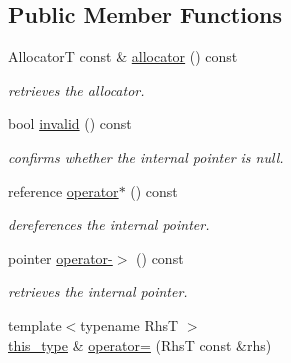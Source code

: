 \subsection*{Public Member Functions}
\begin{DoxyCompactItemize}
\item 
\hypertarget{classhryky_1_1_shared_ptr_a6238460a4d882766f62458ad727f7bb4}{Allocator\-T const \& \hyperlink{classhryky_1_1_shared_ptr_a6238460a4d882766f62458ad727f7bb4}{allocator} () const }\label{classhryky_1_1_shared_ptr_a6238460a4d882766f62458ad727f7bb4}

\begin{DoxyCompactList}\small\item\em retrieves the allocator. \end{DoxyCompactList}\item 
\hypertarget{classhryky_1_1_shared_ptr_a9d49dd75843e0643e8caffd7f740a802}{bool \hyperlink{classhryky_1_1_shared_ptr_a9d49dd75843e0643e8caffd7f740a802}{invalid} () const }\label{classhryky_1_1_shared_ptr_a9d49dd75843e0643e8caffd7f740a802}

\begin{DoxyCompactList}\small\item\em confirms whether the internal pointer is null. \end{DoxyCompactList}\item 
\hypertarget{classhryky_1_1_shared_ptr_ad7132caf81766715ba384f576e2b1b62}{reference \hyperlink{classhryky_1_1_shared_ptr_ad7132caf81766715ba384f576e2b1b62}{operator$\ast$} () const }\label{classhryky_1_1_shared_ptr_ad7132caf81766715ba384f576e2b1b62}

\begin{DoxyCompactList}\small\item\em dereferences the internal pointer. \end{DoxyCompactList}\item 
\hypertarget{classhryky_1_1_shared_ptr_aa12d9a92ab59e8f6c1c06a93390fc1fd}{pointer \hyperlink{classhryky_1_1_shared_ptr_aa12d9a92ab59e8f6c1c06a93390fc1fd}{operator-\/$>$} () const }\label{classhryky_1_1_shared_ptr_aa12d9a92ab59e8f6c1c06a93390fc1fd}

\begin{DoxyCompactList}\small\item\em retrieves the internal pointer. \end{DoxyCompactList}\item 
\hypertarget{classhryky_1_1_shared_ptr_abd4590ba41a2c8837130a38f08f531ba}{{\footnotesize template$<$typename Rhs\-T $>$ }\\\hyperlink{classhryky_1_1_shared_ptr_a0fa551b79990485506c88137044ec4b8}{this\-\_\-type} \& \hyperlink{classhryky_1_1_shared_ptr_abd4590ba41a2c8837130a38f08f531ba}{operator=} (Rhs\-T const \&rhs)}\label{classhryky_1_1_shared_ptr_abd4590ba41a2c8837130a38f08f531ba}


\end{DoxyCompactItemize}
